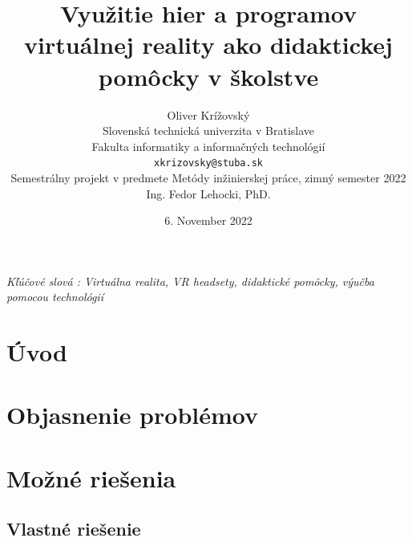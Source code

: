 \documentclass[10pt,oneside,slovak,a4paper]{article}
\title{\textbf{Využitie hier a programov virtuálnej reality ako didaktickej pomôcky v školstve}}
\author{
	Oliver Krížovský\\[2pt]
	{\small Slovenská technická univerzita v Bratislave}\\
	{\small Fakulta informatiky a informačných technológií}\\
	{\small \texttt{xkrizovsky@stuba.sk}}\\
	{\small Semestrálny projekt v predmete Metódy inžinierskej práce, zimný semester 2022}\\
	{\small Ing.  Fedor Lehocki,  PhD.}\\
}
\date{\small 6. November 2022}
\begin{document}
\maketitle
\begin{abstract}

\end{abstract}
\begin{center}
\emph{Kľúčové slová : Virtuálna realita, VR headsety, didaktické pomôcky, výučba pomocou technológií}
\end{center}
\section{Úvod}\label{uvod}

\section{Objasnenie problémov}\label{objasnenie}


\section{Možné riešenia}\label{riesenia}
\subsection{Vlastné riešenie}\label{riesenia:1}

\end{document}
